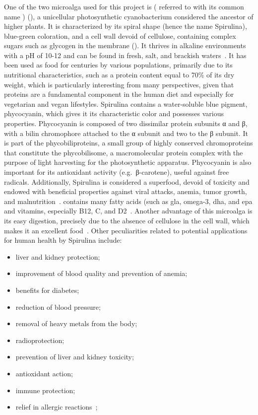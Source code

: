 \subsubsection{}
One of the two microalga used for this project is  ( referred to with its common name ) (), a unicellular photosynthetic cyanobacterium considered the ancestor of higher plants. It is characterized by its spiral shape (hence the name Spirulina), blue-green coloration, and a cell wall devoid of cellulose, containing complex sugars such as glycogen in the membrane (). It thrives in alkaline environments with a pH of 10-12 and can be found in fresh, salt, and brackish waters~\parencite{mohan_spirulina_2014}. It has been used as food for centuries by various populations, primarily due to its nutritional characteristics, such as a protein content equal to 70\% of its dry weight, which is particularly interesting from many perspectives, given that proteins are a fundamental component in the human diet and especially for vegetarian and vegan lifestyles. Spirulina contains a water-soluble blue pigment, phycocyanin, which gives it its characteristic color and possesses various properties. Phycocyanin is composed of two dissimilar protein subunits α and β, with a bilin chromophore attached to the α subunit and two to the β subunit. It is part of the phycobiliproteins, a small group of highly conserved chromoproteins that constitute the phycobilisome, a macromolecular protein complex with the purpose of light harvesting for the photosynthetic apparatus. Phycocyanin is also important for its antioxidant activity (e.g.~β-carotene), useful against free radicals. Additionally, Spirulina is considered a superfood, devoid of toxicity and endowed with beneficial properties against viral attacks, anemia, tumor growth, and malnutrition~\parencite{saranraj_spirulina_2014}.  contains many fatty acids (such as \gls{gla}, omega-3, \gls{dha}, and \gls{epa} and vitamins, especially B12, C, and D2~\parencite{moons_drivers_2017}. Another advantage of this microalga is its easy digestion, precisely due to the absence of cellulose in the cell wall, which makes it an excellent food~\parencite{mohammadi_Spirulina_2022}. Other peculiarities related to potential applications for human health by Spirulina include:
\begin{itemize}
\item liver and kidney protection;
\item improvement of blood quality and prevention of anemia;
\item benefits for diabetes;
\item reduction of blood pressure;
\item removal of heavy metals from the body;
\item radioprotection;
\item prevention of liver and kidney toxicity;
\item antioxidant action;
\item immune protection;
\item relief in allergic reactions~\parencite{mohan_spirulina_2014};
\end{itemize}

